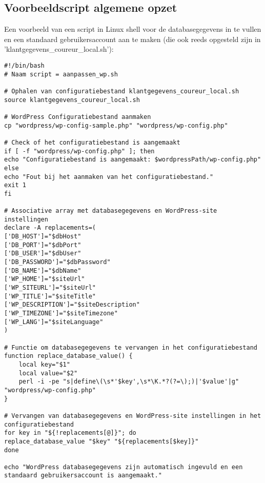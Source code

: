 \subsection{Voorbeeldscript algemene opzet}
Een voorbeeld van een script in Linux shell voor de databasegegevens in te vullen en een standaard gebruikersaccount aan te maken (die ook reeds opgesteld zijn in 'klantgegevens\_coureur\_local.sh'):
\begin{verbatim}
#!/bin/bash
# Naam script = aanpassen_wp.sh

# Ophalen van configuratiebestand klantgegevens_coureur_local.sh
source klantgegevens_coureur_local.sh

# WordPress Configuratiebestand aanmaken
cp "wordpress/wp-config-sample.php" "wordpress/wp-config.php"

# Check of het configuratiebestand is aangemaakt
if [ -f "wordpress/wp-config.php" ]; then
echo "Configuratiebestand is aangemaakt: $wordpressPath/wp-config.php"
else
echo "Fout bij het aanmaken van het configuratiebestand."
exit 1
fi

# Associative array met databasegegevens en WordPress-site instellingen
declare -A replacements=(
['DB_HOST']="$dbHost"
['DB_PORT']="$dbPort"
['DB_USER']="$dbUser"
['DB_PASSWORD']="$dbPassword"
['DB_NAME']="$dbName"
['WP_HOME']="$siteUrl"
['WP_SITEURL']="$siteUrl"
['WP_TITLE']="$siteTitle"
['WP_DESCRIPTION']="$siteDescription"
['WP_TIMEZONE']="$siteTimezone"
['WP_LANG']="$siteLanguage"
)

# Functie om databasegegevens te vervangen in het configuratiebestand
function replace_database_value() {
    local key="$1"
    local value="$2"
    perl -i -pe "s|define\(\s*'$key',\s*\K.*?(?=\);)|'$value'|g" "wordpress/wp-config.php"
}

# Vervangen van databasegegevens en WordPress-site instellingen in het configuratiebestand
for key in "${!replacements[@]}"; do
replace_database_value "$key" "${replacements[$key]}"
done

echo "WordPress databasegegevens zijn automatisch ingevuld en een standaard gebruikersaccount is aangemaakt."
\end{verbatim}
